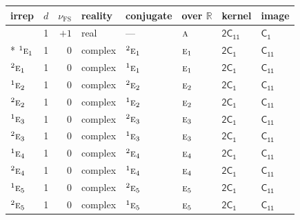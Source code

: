 \documentclass[10pt,a4paper]{article}
\numberwithin{equation}{section}
\newcommand{\grp}[1]{\mathsf{#1}}
\newcommand{\irr}[1]{\text{\normalfont\scshape #1}}
\newcommand{\conjpair}[1]{{}^{#1}}
\newcommand{\detbox}[1]{{\setlength{\fboxsep}{1pt}\fbox{#1}}}
\newcommand{\fsind}{\nu_{\mathrm{FS}}}
\begin{document}
{\small\renewcommand{\arraystretch}{1.25}\setlength{\tabcolsep}{4pt}\begin{longtable}{@{}lrrlllll@{}}\toprule
irrep & $d$ & $\fsind$ & reality & conjugate & over $\mathbb{R}$ & kernel & image\\\midrule\endhead
\bottomrule\endfoot\endlastfoot
\detbox{$\irr{a}$} & 1 & $+1$ & real & --- & $\irr{a}$ & \href{2C11.pdf}{$\grp{2C_{11}}$} & \href{../../../rotation/data/pdf/C1.pdf}{$\grp{C_{1}}$}\\*
$\conjpair{1}\irr{e}_{1}$ & 1 & $0$ & complex & $\conjpair{2}\irr{e}_{1}$ & $\irr{e}_{1}$ & \href{2C1.pdf}{$\grp{2C_{1}}$} & \href{../../../rotation/data/pdf/C11.pdf}{$\grp{C_{11}}$}\\
$\conjpair{2}\irr{e}_{1}$ & 1 & $0$ & complex & $\conjpair{1}\irr{e}_{1}$ & $\irr{e}_{1}$ & \href{2C1.pdf}{$\grp{2C_{1}}$} & \href{../../../rotation/data/pdf/C11.pdf}{$\grp{C_{11}}$}\\
$\conjpair{1}\irr{e}_{2}$ & 1 & $0$ & complex & $\conjpair{2}\irr{e}_{2}$ & $\irr{e}_{2}$ & \href{2C1.pdf}{$\grp{2C_{1}}$} & \href{../../../rotation/data/pdf/C11.pdf}{$\grp{C_{11}}$}\\
$\conjpair{2}\irr{e}_{2}$ & 1 & $0$ & complex & $\conjpair{1}\irr{e}_{2}$ & $\irr{e}_{2}$ & \href{2C1.pdf}{$\grp{2C_{1}}$} & \href{../../../rotation/data/pdf/C11.pdf}{$\grp{C_{11}}$}\\
$\conjpair{1}\irr{e}_{3}$ & 1 & $0$ & complex & $\conjpair{2}\irr{e}_{3}$ & $\irr{e}_{3}$ & \href{2C1.pdf}{$\grp{2C_{1}}$} & \href{../../../rotation/data/pdf/C11.pdf}{$\grp{C_{11}}$}\\
$\conjpair{2}\irr{e}_{3}$ & 1 & $0$ & complex & $\conjpair{1}\irr{e}_{3}$ & $\irr{e}_{3}$ & \href{2C1.pdf}{$\grp{2C_{1}}$} & \href{../../../rotation/data/pdf/C11.pdf}{$\grp{C_{11}}$}\\
$\conjpair{1}\irr{e}_{4}$ & 1 & $0$ & complex & $\conjpair{2}\irr{e}_{4}$ & $\irr{e}_{4}$ & \href{2C1.pdf}{$\grp{2C_{1}}$} & \href{../../../rotation/data/pdf/C11.pdf}{$\grp{C_{11}}$}\\
$\conjpair{2}\irr{e}_{4}$ & 1 & $0$ & complex & $\conjpair{1}\irr{e}_{4}$ & $\irr{e}_{4}$ & \href{2C1.pdf}{$\grp{2C_{1}}$} & \href{../../../rotation/data/pdf/C11.pdf}{$\grp{C_{11}}$}\\
$\conjpair{1}\irr{e}_{5}$ & 1 & $0$ & complex & $\conjpair{2}\irr{e}_{5}$ & $\irr{e}_{5}$ & \href{2C1.pdf}{$\grp{2C_{1}}$} & \href{../../../rotation/data/pdf/C11.pdf}{$\grp{C_{11}}$}\\
$\conjpair{2}\irr{e}_{5}$ & 1 & $0$ & complex & $\conjpair{1}\irr{e}_{5}$ & $\irr{e}_{5}$ & \href{2C1.pdf}{$\grp{2C_{1}}$} & \href{../../../rotation/data/pdf/C11.pdf}{$\grp{C_{11}}$}\\

\end{longtable}}
\end{document}
